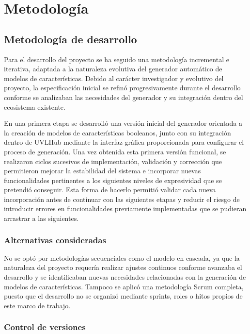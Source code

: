 \section{Metodología}
\label{sec:metodologia}

\subsection{Metodología de desarrollo}
\label{sec:metodologia_desarrollo}


Para el desarrollo del proyecto se ha seguido una metodología incremental e iterativa, adaptada a la naturaleza evolutiva del generador automático de modelos de características. Debido al carácter investigador y evolutivo del proyecto, la especificación inicial se refinó progresivamente durante el desarrollo conforme se analizaban las necesidades del generador y su integración dentro del ecosistema existente.

En una primera etapa se desarrolló una versión inicial del generador orientada a la creación de modelos de características booleanos, junto con su integración dentro de UVLHub mediante la interfaz gráfica proporcionada para configurar el proceso de generación. Una vez obtenida esta primera versión funcional, se realizaron ciclos sucesivos de implementación, validación y corrección que permitieron mejorar la estabilidad del sistema e incorporar nuevas funcionalidades pertinentes a los siguientes niveles de expresividad que se pretendió conseguir. Esta forma de hacerlo permitió validar cada nueva incorporación antes de continuar con las siguientes etapas y reducir el riesgo de introducir errores en funcionalidades previamente implementadas que se pudieran arrastrar a las siguientes.


\subsubsection*{Alternativas consideradas}

No se optó por metodologías secuenciales como el modelo en cascada, ya que la naturaleza del proyecto requería realizar ajustes continuos conforme avanzaba el desarrollo y se identificaban nuevas necesidades relacionadas con la generación de modelos de características. Tampoco se aplicó una metodología Scrum completa, puesto que el desarrollo no se organizó mediante sprints, roles o hitos propios de este marco de trabajo.


\subsubsection*{Control de versiones}

